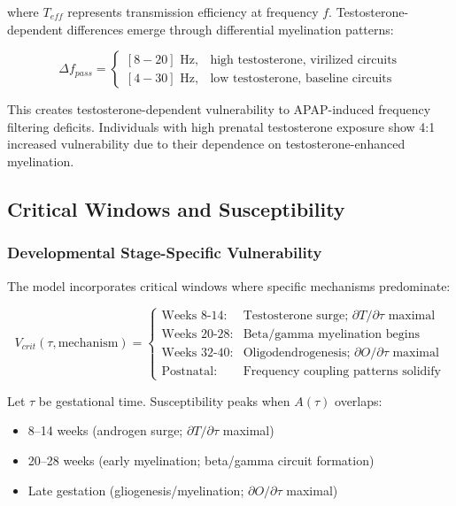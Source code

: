 \documentclass[11pt]{article}
\let\oldsubsection\subsection
\renewcommand{\subsection}[1]{\oldsubsection{#1}\setlength{\leftskip}{0.75em}}
\let\oldsubsubsection\subsubsection
\renewcommand{\subsubsection}[1]{\oldsubsubsection{#1}\setlength{\leftskip}{1.5em}}
\begin{document}
where $T_{eff}$ represents transmission efficiency at frequency $f$. Testosterone-dependent differences emerge through differential myelination patterns:

\begin{equation}
\Delta f_{pass} = \begin{cases}
[8-20] \text{ Hz}, & \text{high testosterone, virilized circuits} \\
[4-30] \text{ Hz}, & \text{low testosterone, baseline circuits}
\end{cases}
\end{equation}

This creates testosterone-dependent vulnerability to APAP-induced frequency filtering deficits. Individuals with high prenatal testosterone exposure show 4:1 increased vulnerability due to their dependence on testosterone-enhanced myelination.

\subsection{Critical Windows and Susceptibility}

\subsubsection{Developmental Stage-Specific Vulnerability}

The model incorporates critical windows where specific mechanisms predominate:

\begin{equation}
V_{crit}(\tau, \text{mechanism}) = 
\begin{cases}
\text{Weeks 8-14}: & \text{Testosterone surge; } \partial T/\partial\tau \text{ maximal} \\
\text{Weeks 20-28}: & \text{Beta/gamma myelination begins} \\
\text{Weeks 32-40}: & \text{Oligodendrogenesis; } \partial O/\partial\tau \text{ maximal} \\
\text{Postnatal}: & \text{Frequency coupling patterns solidify}
\end{cases}
\end{equation}

Let $\tau$ be gestational time. Susceptibility peaks when $A(\tau)$ overlaps:
\begin{itemize}
\item 8--14 weeks (androgen surge; $\partial T/\partial \tau$ maximal)
\item 20--28 weeks (early myelination; beta/gamma circuit formation)
\item Late gestation (gliogenesis/myelination; $\partial O/\partial \tau$ maximal)
\end{itemize}
\end{document}
